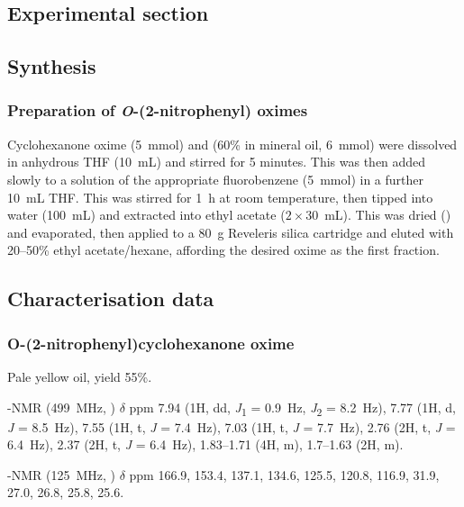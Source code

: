 \begin{refsection}
\section{Experimental section}

\subsection{Synthesis}

\subsubsection[Preparation of \refcmpd{cyclohexanone-oxime-2np,cyclohexanone-oxime-2n.5nme2p,cyclohexanone-oxime-2n.5mp}]{Preparation of \emph{O}-(2-nitrophenyl) oximes }
Cyclohexanone oxime (5~mmol) and  (60\% in mineral oil, 6~mmol) were dissolved in anhydrous THF (10~mL) and stirred for 5 minutes.
This was then added slowly to a solution of the appropriate fluorobenzene (5~mmol) in a further 10~mL THF.\@
This was stirred for 1~h at room temperature, then tipped into water (100~mL) and extracted into ethyl acetate ($2\times30$~mL).
This was dried () and evaporated, then applied to a 80~g Reveleris silica cartridge and eluted with 20--50\% ethyl acetate/hexane, affording the desired oxime as the first fraction.

\subsection{Characterisation data}

\subsubsection{O-(2-nitrophenyl)cyclohexanone oxime }

Pale yellow oil, yield 55\%.

-NMR (499~MHz, ) $\delta$ ppm 7.94 (1H, dd, \textit{J}\textsubscript{1} = 0.9~Hz, \textit{J}\textsubscript{2} = 8.2~Hz), 7.77 (1H, d, \textit{J} = 8.5~Hz), 7.55 (1H, t, \textit{J} = 7.4~Hz), 7.03 (1H, t, \textit{J} = 7.7~Hz), 2.76 (2H, t, \textit{J} = 6.4~Hz), 2.37 (2H, t, \textit{J} = 6.4~Hz), 1.83--1.71 (4H, m), 1.7--1.63 (2H, m).

-NMR (125~MHz, ) $\delta$ ppm 166.9, 153.4, 137.1, 134.6, 125.5, 120.8, 116.9, 31.9, 27.0, 26.8, 25.8, 25.6.


\end{refsection}
